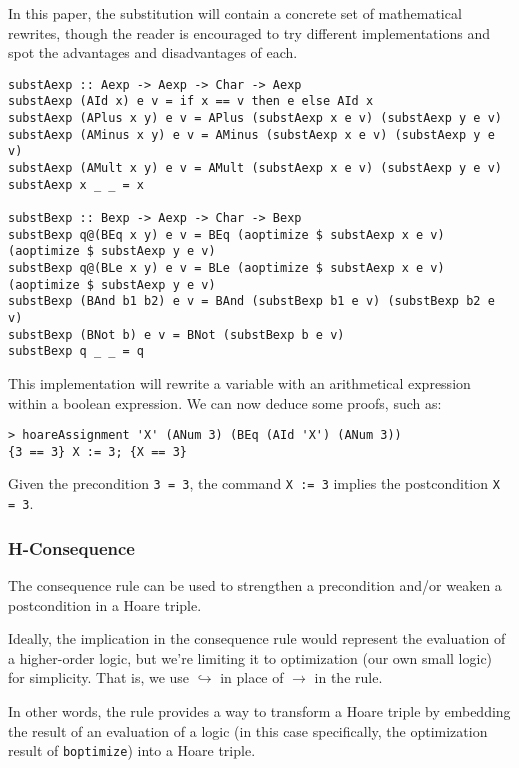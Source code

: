 \documentclass{article}
\begin{document}
In this paper, the substitution will contain a concrete set of mathematical rewrites, though the reader is encouraged to try different implementations and spot the advantages and disadvantages of each.

\begin{lstlisting}
substAexp :: Aexp -> Aexp -> Char -> Aexp
substAexp (AId x) e v = if x == v then e else AId x
substAexp (APlus x y) e v = APlus (substAexp x e v) (substAexp y e v)
substAexp (AMinus x y) e v = AMinus (substAexp x e v) (substAexp y e v)
substAexp (AMult x y) e v = AMult (substAexp x e v) (substAexp y e v)
substAexp x _ _ = x

substBexp :: Bexp -> Aexp -> Char -> Bexp
substBexp q@(BEq x y) e v = BEq (aoptimize $ substAexp x e v) (aoptimize $ substAexp y e v)
substBexp q@(BLe x y) e v = BLe (aoptimize $ substAexp x e v) (aoptimize $ substAexp y e v)
substBexp (BAnd b1 b2) e v = BAnd (substBexp b1 e v) (substBexp b2 e v)
substBexp (BNot b) e v = BNot (substBexp b e v)
substBexp q _ _ = q
\end{lstlisting}

This implementation will rewrite a variable with an arithmetical expression within a boolean expression. We can now deduce some proofs, such as:

\begin{lstlisting}
> hoareAssignment 'X' (ANum 3) (BEq (AId 'X') (ANum 3))
{3 == 3} X := 3; {X == 3}
\end{lstlisting}

Given the precondition \texttt{3 = 3}, the command \texttt{X := 3} implies the postcondition \texttt{X = 3}.

\subsubsection{H-Consequence}

The consequence rule can be used to strengthen a precondition and/or weaken a postcondition in a Hoare triple.

Ideally, the implication in the consequence rule would represent the evaluation of a higher-order logic, but we're limiting it to optimization (our own small logic) for simplicity. That is, we use $\hookrightarrow$ in place of $\to$ in the rule.

In other words, the rule provides a way to transform a Hoare triple by embedding the result of an evaluation of a logic (in this case specifically, the optimization result of \texttt{boptimize}) into a Hoare triple.
\end{document}
